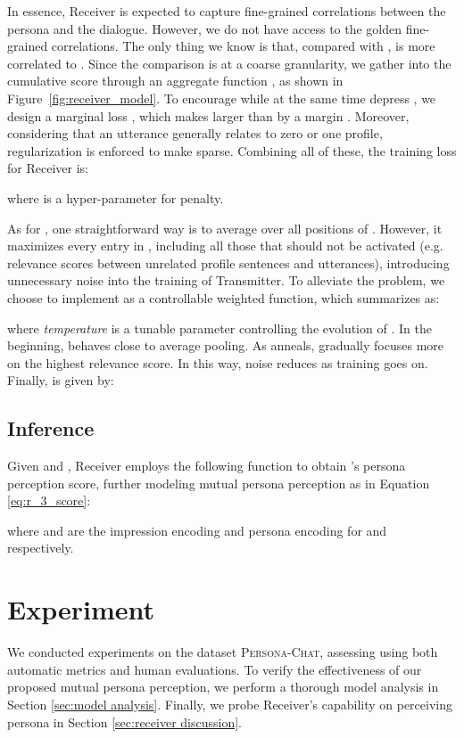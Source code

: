\documentclass[11pt,a4paper]{article}
\begin{document}
In essence, Receiver is expected to capture fine-grained correlations between the persona and the dialogue. However, we do not have access to the golden fine-grained correlations. The only thing we know is that, compared with ,  is more correlated to . Since the comparison is at a coarse granularity, we gather  into the cumulative score  through an aggregate function , as shown in Figure~\ref{fig:receiver_model}. To encourage  while at the same time depress , we design a marginal loss , which makes  larger than  by a margin . Moreover, considering that an utterance generally relates to zero or one profile,  regularization is enforced to make  sparse. Combining all of these, the training loss for Receiver is:

where  is a hyper-parameter for penalty.

As for , one straightforward way is to average over all positions of . However, it maximizes every entry in , including all those that should not be activated (e.g. relevance scores between unrelated profile sentences and utterances), introducing unnecessary noise into the training of Transmitter. To alleviate the problem, we choose to implement  as a controllable weighted function, which summarizes  as:

where \emph{temperature}  is a tunable parameter \cite{hinton2015distilling} controlling the evolution of . In the beginning,  behaves close to average pooling. As  anneals,  gradually focuses more on the highest relevance score. In this way, noise reduces as training goes on. 
Finally,  is given by:



\subsection{Inference}

Given  and , Receiver employs the following function to obtain 's persona perception score, further modeling mutual persona perception as in Equation \ref{eq:r_3_score}:

where  and  are the impression encoding and persona encoding for  and  respectively.

\section{Experiment}

We conducted experiments on the dataset \textsc{Persona-Chat}, assessing  using both automatic metrics and human evaluations. 
To verify the effectiveness of our proposed mutual persona perception, we perform a thorough model analysis in Section \ref{sec:model analysis}. Finally, we probe Receiver's capability on perceiving persona in Section \ref{sec:receiver discussion}.
\end{document}
